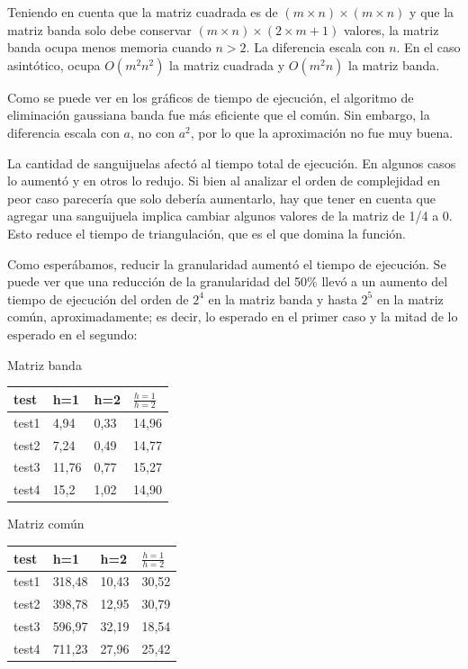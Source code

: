 \documentclass[a4paper]{article}
\begin{document}
Teniendo en cuenta que la matriz cuadrada es de $(m \times n) \times (m \times n)$ y que la matriz banda solo debe conservar $(m \times n) \times (2 \times m + 1)$ valores, la matriz banda ocupa menos memoria cuando $n > 2$. La diferencia escala con $n$. En el caso asintótico, ocupa $O(m^2 n^2)$ la matriz cuadrada y $O(m^2 n)$ la matriz banda.

Como se puede ver en los gráficos de tiempo de ejecución, el algoritmo de eliminación gaussiana banda fue más eficiente que el común. Sin embargo, la diferencia escala con $a$, no con $a^2$, por lo que la aproximación no fue muy buena.

La cantidad de sanguijuelas afectó al tiempo total de ejecución. En algunos casos lo aumentó y en otros lo redujo. Si bien al analizar el orden de complejidad en peor caso parecería que solo debería aumentarlo, hay que tener en cuenta que agregar una sanguijuela implica cambiar algunos valores de la matriz de 1/4 a 0. Esto reduce el tiempo de triangulación, que es el que domina la función. %

Como esperábamos, reducir la granularidad aumentó el tiempo de ejecución. Se puede ver que una reducción de la granularidad del 50$\%$ llevó a un aumento del tiempo de ejecución del orden de $2^4$ en la matriz banda y hasta $2^5$ en la matriz común, aproximadamente; es decir, lo esperado en el primer caso y la mitad de lo esperado en el segundo:\newline

Matriz banda \newline

\begin{tabular}{ l|l l l}
  test & h=1 & h=2 & $\frac{h=1}{h=2}$ \\
  \hline
  test1 & 4,94 & 0,33 & 14,96 \\
  test2 & 7,24 & 0,49 & 14,77 \\
  test3 & 11,76 & 0,77 & 15,27 \\
  test4 & 15,2 & 1,02 & 14,90 \\
\end{tabular} \newline \newline

Matriz común \newline

\begin{tabular}{ l|l l l}
  test & h=1 & h=2 & $\frac{h=1}{h=2}$ \\
  \hline
  test1 & 318,48 & 10,43 & 30,52 \\
  test2 & 398,78 & 12,95 & 30,79 \\
  test3 & 596,97 & 32,19 & 18,54 \\
  test4 & 711,23 & 27,96 & 25,42 \\
\end{tabular} \newline \newline
\end{document}
